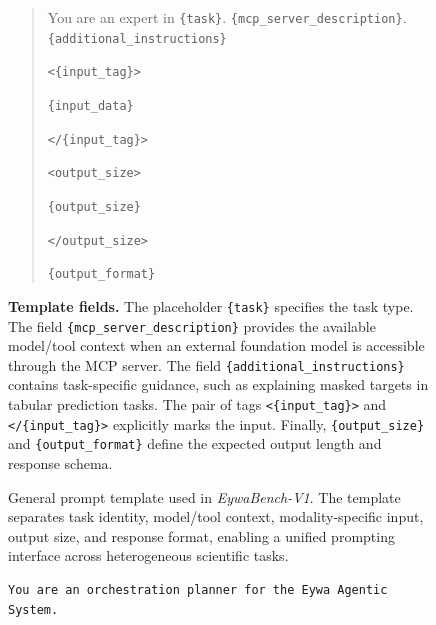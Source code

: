 \documentclass{llmxive}
\begin{document}
{\begin{figure}[!htbp]
{\begin{tcolorbox}[
colback=gray!5!white,
colframe=blue!70,
title=Prompt Template B.1: General Prompt Structure,
boxrule=0.3mm,
width=1.2\textwidth,
arc=2mm,
auto outer arc=true
]
\begin{quote}
You are an expert in \texttt{\{task\}}. 
\texttt{\{mcp\_server\_description\}}. 
\texttt{\{additional\_instructions\}}

\medskip

\texttt{<\{input\_tag\}>}

\texttt{\{input\_data\}}

\texttt{</\{input\_tag\}>}

\medskip

\texttt{<output\_size>}

\texttt{\{output\_size\}}

\texttt{</output\_size>}

\medskip

\texttt{\{output\_format\}}
\end{quote}

\textbf{Template fields.}
The placeholder \texttt{\{task\}} specifies the task type.
The field \texttt{\{mcp\_server\_description\}} provides the available model/tool context when an external foundation model is accessible through the MCP server. 
The field \texttt{\{additional\_instructions\}} contains task-specific guidance, such as explaining masked targets in tabular prediction tasks. 
The pair of tags \texttt{<\{input\_tag\}>} and \texttt{</\{input\_tag\}>} explicitly marks the input. 
Finally, \texttt{\{output\_size\}} and \texttt{\{output\_format\}} define the expected output length and response schema.

\end{tcolorbox}}
\caption{
General prompt template used in \textit{EywaBench-V1}. The template separates task identity, model/tool context, modality-specific input, output size, and response format, enabling a unified prompting interface across heterogeneous scientific tasks.
}
\label{fig:prompt_template_general}
\end{figure}







\begin{figure}[!htbp]
\centering
\begin{tcolorbox}[
colback=gray!5!white,
colframe=blue!70,
title=Prompt Template B.2: Planner Prompt for \textit{EywaOrchestra},
boxrule=0.3mm,
width=\textwidth,
arc=2mm,
auto outer arc=true
]


\footnotesize
\begin{verbatim}
You are an orchestration planner for the Eywa Agentic System.


\end{verbatim}
\end{tcolorbox}
\end{figure}}
\end{document}
